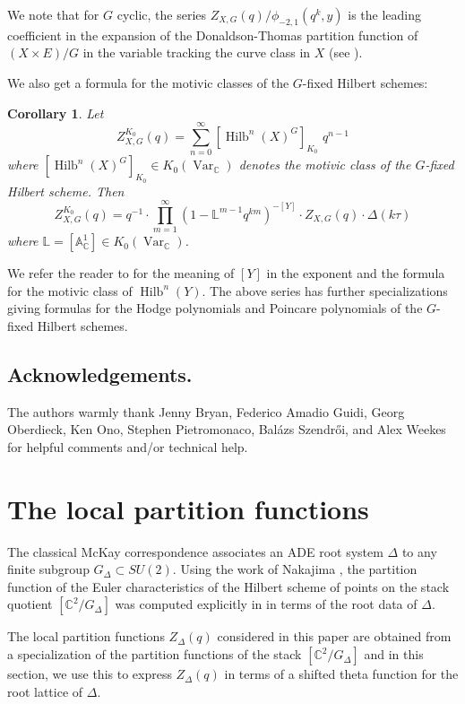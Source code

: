 \documentclass{amsart}
\newtheorem{corollary}[theorem]{Corollary}
\theoremstyle{definition}
\newcommand{\CC} {{\mathbb C}}          %
\newcommand{\LL}{\mathbb{L}}
\newcommand{\Hilb}{\operatorname{Hilb}}
\begin{document}
We note that for $G$ cyclic, the series
$Z_{X,G}(q)/\phi_{-2,1}(q^{k},y) $ is the leading coefficient in the
expansion of the Donaldson-Thomas partition function of $(X\times
E)/G$ in the variable tracking the curve class in $X$ (see
\cite[Thm~0.1]{bryan2018chl}).

We also get a formula for the motivic classes of the $G$-fixed Hilbert schemes:


\begin{corollary}\label{cor: ZK0 formula}
Let 
\[
Z^{K_{0}}_{X,G}(q) = \sum_{n=0}^{\infty} [\Hilb^{n}(X)^{G}]_{K_{0}}\,\, q^{n-1}
\]
where $ [\Hilb^{n}(X)^{G}]_{K_{0}}\in K_{0}(\operatorname{Var}_{\CC})$
denotes the motivic class of the $G$-fixed Hilbert scheme. Then
\[
Z^{K_{0}}_{X,G}(q) = q^{-1}\cdot \prod_{m=1}^{\infty} \left(1-\LL^{m-1}
q^{km} \right)^{-[Y]}  \cdot Z_{X,G}(q)\cdot \Delta (k\tau )
\]
where $\LL  = [\mathbb{A}^{1}_{\CC}]\in
K_{0}(\operatorname{Var}_{\CC})$.
\end{corollary}
We refer the reader to \cite{GZ-L-MH-power} for the meaning
of $[Y]$ in the exponent and the formula for the motivic class of
$\Hilb^{n}(Y)$. The above series has further specializations giving formulas for the  Hodge polynomials and
Poincare polynomials of the $G$-fixed Hilbert schemes.



\subsection{Acknowledgements.} The authors warmly thank Jenny Bryan,
Federico Amadio Guidi, Georg Oberdieck, Ken Ono, Stephen Pietromonaco,
Bal\'azs Szendr\H{o}i, and Alex Weekes for helpful comments and/or
technical help.

\section{The local partition functions}\label{sec: local partition functions}

The classical McKay correspondence associates an ADE root system
$\Delta$ to any finite subgroup $ G_{\Delta}\subset SU(2)$. Using
the work of Nakajima \cite{nakajima2002geometric}, the partition function of the
Euler characteristics of the Hilbert scheme of points on the stack
quotient $[\CC^{2}/G_{\Delta}]$ was computed explicitly in
\cite{gyenge2015euler} in terms of the root data of $\Delta$.

The local partition functions $Z_{\Delta}(q)$ considered in this paper
are obtained from a specialization of the partition functions of the
stack $[\CC^{2} /G_{\Delta}]$ and in this section, we use this to express
$Z_{\Delta}(q)$ in terms of a shifted theta function for the root
lattice of $\Delta$.
\end{document}
